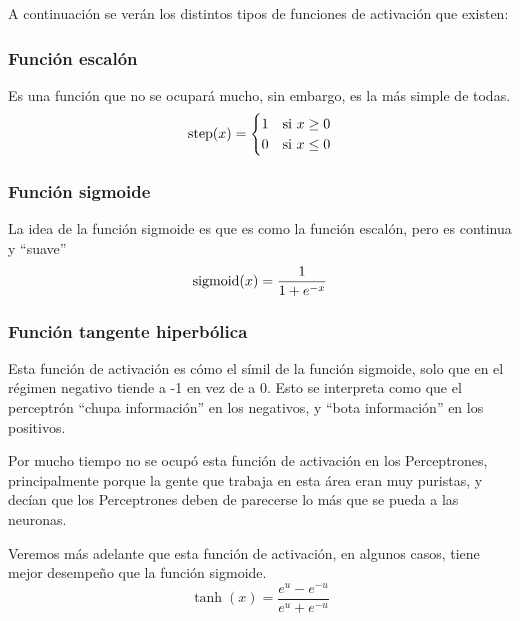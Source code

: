 A continuación se verán los distintos tipos de funciones de activación que existen:

\subsubsection*{Función escalón}
Es una función que no se ocupará mucho, sin embargo, es la más simple de todas. 
\begin{equation}
    \operatorname{step}(x)=
    \begin{cases}
    1 & \mbox{si } x\geq 0\\
    0 & \mbox{si } x\leq 0
    \end{cases}
\end{equation}


\subsubsection*{Función sigmoide}
La idea de la función sigmoide es que es como la función escalón, pero es continua y ``suave''
\begin{equation}
    \operatorname{sigmoid}(x) = \frac{1}{1 + e^{-x}}
\end{equation}


\subsubsection*{Función tangente hiperbólica}
Esta función de activación es cómo el símil de la función sigmoide, solo que en el régimen negativo tiende a -1 en vez de a 0. Esto se interpreta como que el perceptrón ``chupa información'' en los negativos, y ``bota información'' en los positivos.

Por mucho tiempo no se ocupó esta función de activación en los Perceptrones, principalmente porque la gente que trabaja en esta área eran muy puristas, y decían que los Perceptrones deben de parecerse lo más que se pueda a las neuronas.

Veremos más adelante que esta función de activación, en algunos casos, tiene mejor desempeño que la función sigmoide.
\begin{equation}
    \tanh(x) = \frac{e^u - e^{-u}}{e^u + e^{-u}}
\end{equation}

